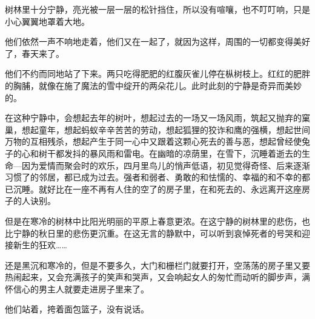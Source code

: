 树林里十分宁静，亮光被一层一层的松针挡住，所以没有喧嚷，也不叮叮响，只是小心翼翼地罩着大地。

他们依然一声不响地走着，他们又在一起了，就因为这样，周围的一切都变得美好了，春天来了。

他们不约而同地站了下来。两只吃得肥肥的红腹灰雀儿停在枞树枝上。红红的肥胖的胸脯，就像在施了魔法的雪中绽开的两朵花儿。此时此刻的宁静是奇异而美妙的。

在这种宁静中，会想起去年的树叶，想起过去的一场又一场风雨，筑起又抛弃的窠巢，想起童年，想起蚂蚁辛辛苦苦的劳动，想起狐狸的狡诈和鹰的强横，想起世间万物的互相残杀，想起产生于同一心中又跟着这颗心死去的善与恶，想起曾经使兔子的心和树干都发抖的暴风雨和雷电。在幽暗的凉荫里，在雪下，沉睡着逝去的生命—因为爱情而聚会时的欢乐，四月里鸟儿的悄声低语，初见觉得奇怪、后来逐渐习惯了的邻居，都已成为过去。强者和弱者、勇敢的和怯懦的、幸福的和不幸的都已沉睡。就好比在一座不再有人住的空了的房子里，在和死去的、永远离开这座房子的人诀别。

但是在寒冷的树林中比阳光明丽的平原上春意更浓。在这宁静的树林里的悲伤，也比宁静的秋日里的悲伤更沉重。在这无言的静默中，可以听到哀悼死者的号哭和迎接新生的狂欢……

还是黑沉和寒冷的，但是不要多久，大门和栅栏门就要打开，空荡荡的房子里又要热闹起来，又会充满孩子的笑声和哭声，又会响起女人的匆忙而动听的脚步声，满怀信心的男主人就要走进房子里来了。

他们站着，挎着面包篮子，没有说话。

